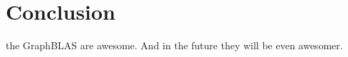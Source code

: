 %
%
\section{Conclusion}
\label{sec:conclusion}

the GraphBLAS are awesome.  And in the future they will be even awesomer.
